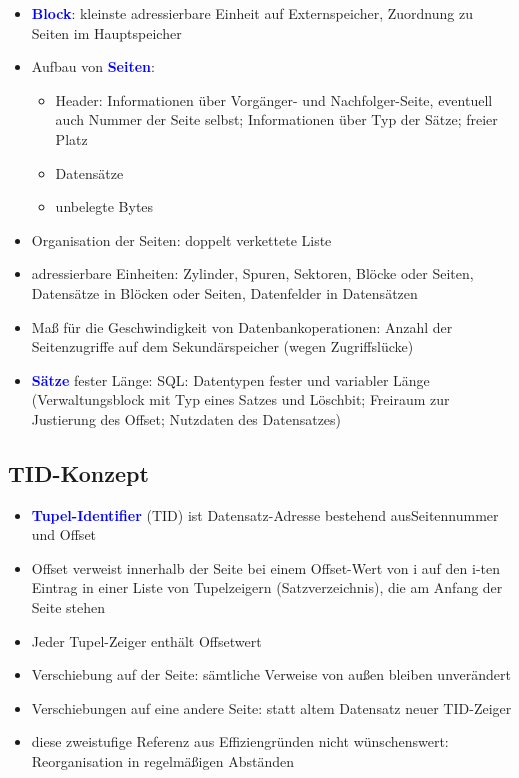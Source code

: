 \documentclass{scrartcl}
\newcommand{\key}[1]{{\textcolor{blue}{\textbf{#1}}}}
\begin{document}
\begin{itemize}
	\itemsep0em
	\item \key{Block}: kleinste adressierbare Einheit auf Externspeicher, Zuordnung zu Seiten im Hauptspeicher
	\item Aufbau von \key{Seiten}:
	\begin{itemize}
		\item Header: Informationen über Vorgänger- und Nachfolger-Seite, eventuell auch Nummer der Seite selbst; Informationen über Typ der Sätze; freier Platz
		\item Datensätze
		\item unbelegte Bytes
	\end{itemize}
	\item Organisation der Seiten: doppelt verkettete Liste
	\item adressierbare Einheiten: Zylinder, Spuren, Sektoren, Blöcke oder Seiten, Datensätze in Blöcken oder Seiten, Datenfelder in Datensätzen
	\item Maß für die Geschwindigkeit von Datenbankoperationen: Anzahl der Seitenzugriffe auf dem Sekundärspeicher (wegen Zugriffslücke)
	\item \key{Sätze} fester Länge: SQL: Datentypen fester und variabler Länge (Verwaltungsblock mit Typ eines Satzes und Löschbit; Freiraum zur Justierung des Offset; Nutzdaten des Datensatzes)
\end{itemize}

\subsection{TID-Konzept}

\begin{itemize}
	\itemsep0em
	\item \key{Tupel-Identifier} (TID) ist Datensatz-Adresse bestehend ausSeitennummer und Offset
	\item Offset verweist innerhalb der Seite bei einem Offset-Wert von i auf den i-ten Eintrag in einer Liste von Tupelzeigern (Satzverzeichnis), die am Anfang der Seite stehen
	\item Jeder Tupel-Zeiger enthält Offsetwert
	\item Verschiebung auf der Seite: sämtliche Verweise von außen bleiben unverändert
	\item Verschiebungen auf eine andere Seite: statt altem Datensatz neuer TID-Zeiger
	\item diese zweistufige Referenz aus Effiziengründen nicht wünschenswert: Reorganisation in regelmäßigen Abständen
\end{itemize}
\end{document}
